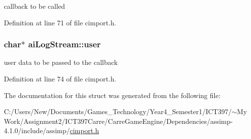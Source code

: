 callback to be called 

Definition at line 71 of file cimport.h.\hypertarget{structai_log_stream_3382042e4171a6dd5a71d7f98741f86e}{
\subsubsection[user]{\setlength{\rightskip}{0pt plus 5cm}char$\ast$ {\bf aiLogStream::user}}}
\label{structai_log_stream_3382042e4171a6dd5a71d7f98741f86e}


user data to be passed to the callback 

Definition at line 74 of file cimport.h.

The documentation for this struct was generated from the following file:\begin{CompactItemize}
\item 
C:/Users/New/Documents/Games\_\-Technology/Year4\_\-Semester1/ICT397/$\sim$My Work/Assignment2/ICT397Carre/CarreGameEngine/Dependencies/assimp-4.1.0/include/assimp/\hyperlink{cimport_8h}{cimport.h}\end{CompactItemize}

